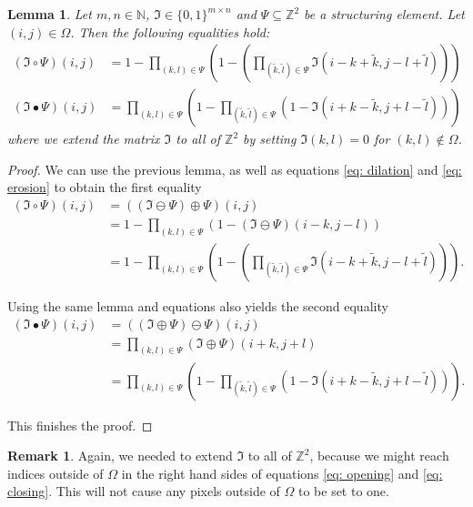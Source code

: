 \documentclass[a4paper,12pt]{article}
\theoremstyle{plain}
\newtheorem{lemma}[theorem]{Lemma}
\theoremstyle{definition}
\newtheorem{remark}[theorem]{Remark}
\begin{document}
\begin{lemma}
	Let $m, n \in \mathbb{N}$, $\mathfrak{I} \in \{ 0, 1 \}^{m \times n}$ and $\Psi \subseteq \mathbb{Z}^2$ be a structuring element. Let $(i, j) \in \Omega$. Then the following equalities hold:
	\begin{align}
		(\mathfrak{I} \circ \Psi)(i, j) &= 1 - \prod_{(k, l) \in \Psi} \left( 1 - \left( \prod_{(\tilde{k}, \tilde{l}) \in \Psi} \mathfrak{I}(i - k + \tilde{k}, j - l + \tilde{l}) \right) \right) \label{eq: opening} \\
		(\mathfrak{I} \bullet \Psi)(i, j) &= \prod_{(k, l) \in \Psi} \left( 1 - \prod_{(\tilde{k}, \tilde{l}) \in \Psi} ( 1 - \mathfrak{I}(i + k - \tilde{k}, j + l - \tilde{l}) ) \right) \label{eq: closing}
	\end{align}
	where we extend the matrix $\mathfrak{I}$ to all of $\mathbb{Z}^2$ by setting $\mathfrak{I}(k, l) = 0$ for $(k, l) \notin \Omega$.
\end{lemma}
\begin{proof}
	We can use the previous lemma, as well as equations \eqref{eq: dilation} and \eqref{eq: erosion} to obtain the first equality
	\begin{align*}
		(\mathfrak{I} \circ \Psi)(i, j) &= ((\mathfrak{I} \ominus \Psi) \oplus \Psi)(i, j) \\
		&= 1 - \prod_{(k, l) \in \Psi} ( 1 - (\mathfrak{I} \ominus \Psi)(i - k, j - l) ) \\
		&= 1 - \prod_{(k, l) \in \Psi} \left( 1 - \left( \prod_{(\tilde{k}, \tilde{l}) \in \Psi} \mathfrak{I}(i - k + \tilde{k}, j - l + \tilde{l}) \right) \right).
	\end{align*}
	
	Using the same lemma and equations also yields the second equality
	\begin{align*}
		(\mathfrak{I} \bullet \Psi)(i, j) &= ((\mathfrak{I} \oplus \Psi) \ominus \Psi)(i, j) \\
		&= \prod_{(k, l) \in \Psi} (\mathfrak{I} \oplus \Psi)(i + k, j + l) \\
		&= \prod_{(k, l) \in \Psi} \left( 1 - \prod_{(\tilde{k}, \tilde{l}) \in \Psi} ( 1 - \mathfrak{I}(i + k - \tilde{k}, j + l - \tilde{l}) ) \right).
	\end{align*}
	
	This finishes the proof.
\end{proof}

\begin{remark}
	Again, we needed to extend $\mathfrak{I}$ to all of $\mathbb{Z}^2$, because we might reach indices outside of $\Omega$ in the right hand sides of equations \eqref{eq: opening} and \eqref{eq: closing}. This will not cause any pixels outside of $\Omega$ to be set to one.
\end{remark}
\end{document}
